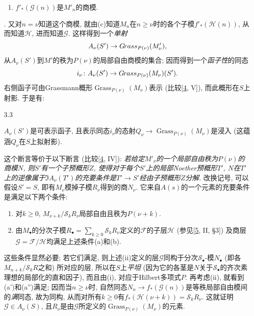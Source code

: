 \begin{enumerate}
    
 \item[a''.]\(f'_*(\mathscr {G} (n))\)是\(M'_n\)的商模.

  
\end{enumerate}. 又对\(n=\nu \)知道这个商模, 就由(c)知道\(M_n\)在\(n\geqslant \nu \)时的各个子模\(f'_*(\mathscr {H} (n))\), 从而知道\(\mathscr {H}\), 进而知道\(\mathscr {G}\). 这样得到一个\emph{单射}\[     A_\nu (S') \to  \mathscr {G}\kern  -1.25pt\mathit {rass}_{P(\nu )} (M'_\nu ),\] 从\(A_\nu (S')\)到\(M'\)的秩为\(P(\nu )\)的局部自由商模的集合; 因而得到一个\emph{函子性}的同态\[     i_\nu \colon  A_\nu (S') \to  \mathscr {G}\kern  -1.25pt\mathit {rass}_{P(\nu )} (M_\nu )(S').\] 右侧函子可由Grassmann概形\(\operatorname {Grass}_{P(\nu )} (M_\nu )\)表示 (比较[\hyperref[Gro1960a]{4}, V]), 而此概形在\(S\)上射影. 于是有:
\begin{lemma}{3.3}\label{fga3.iv-3-lemma-3.3}\skipsinglepar
\par{}\(A_\nu (S')\)是可表示函子, 且表示同态\(i_\nu \)的态射\(Q_\nu \to \operatorname {Grass}_{P(\nu )} (M_\nu )\)是浸入 (这蕴涵\(Q_\nu \)在\(S\)上拟射影).
\end{lemma}
\par{}这个断言等价于以下断言 (比较[\hyperref[Gro1960a]{4}, IV]): \emph{若给定\(M'_\nu \)的一个局部自由秩为\(P(\nu )\)的商模\(N\), 则\(S'\)有一个子预概形\(Z\), 使得对于每个\(S'\)上的局部Noether预概形\(T'\), \(N\)在\(T'\)上的逆像属于\(\Im  A_\nu (T')\)的充要条件是\(T'\to  S'\)经由子预概形\(Z\)分解.} 改换记号, 可以假设\(S'=S\), 即有\(M_\nu \)模掉子模\(R_\nu \)得到的商\(N_\nu \). 它来自\(A(s)\)的一个元素的充要条件是满足以下两个条件: 
\begin{enumerate}
    
 \item[i.]对\(k\geqslant 0\), \(M_{\nu +k}/\mathcal {S}_k R_\nu \)局部自由且秩为\(P(\nu +k)\).

    
 \item[ii.]由\(M_\bullet \)的分次子模\(R_\bullet =\sum _{k\geqslant 0}\mathscr {S}_kR_\nu \)定义的\(\mathscr {F}\)的子层\(\mathscr {H}\) (参见[\hyperref[GD1960]{5}, II, §3]) 及商层\(\mathscr {G}=\mathscr {F}/\mathscr {H}\)均满足上述条件(a)和(b).

  
\end{enumerate} 这些条件显然必要; 若它们满足, 则上述(ii)定义的层\(\mathscr {G}\)同构于分次\(\mathscr {S}_\bullet \)-模\(N_\bullet \) (即各\(M_{n+k}/\mathscr {S}_kR\)之和) 所对应的层, 所以在\(S\)上\emph{平坦} (因为它的各茎是\(N\)关于\(\mathcal {S}_\bullet \)的齐次素理想的局部化的直和因子), 而且由(i), 对应于Hilbert多项式\(P\). 再考虑(ii), 就看到(a')和(a'')满足; 因而当\(n\geqslant \nu \)时, 自然同态\(N_n\to  f_*(\mathscr {G} (n))\)是等秩局部自由模间的\emph{满}同态, 故为同构, 从而对所有\(k\geqslant 0\)有\(f_*(\mathscr {H} (\nu +k))=\mathcal {S}_kR_\nu \). 这就证明\(\mathscr {G}\in  A_\nu (S)\), 且\(R_\nu \)是由\(\mathscr {G}\)所定义的\(\operatorname {Grass}_{P(\nu )} (M_\nu )\)的元素.
